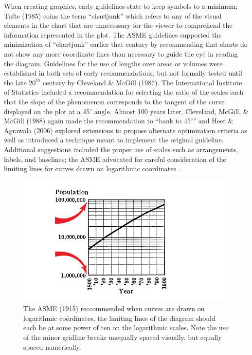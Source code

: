 \documentclass[print]{nuthesis}
\begin{document}
When creating graphics, early guidelines state to keep symbols to a minimum; Tufte (1985) coins the term ``chartjunk'' which refers to any of the visual elements in the chart that are unnecessary for the viewer to comprehend the information represented in the plot.
The ASME guidelines supported the minimization of ``chartjunk'' earlier that century by recommending that charts do not show any more coordinate lines than necessary to guide the eye in reading the diagram.
Guidelines for the use of lengths over areas or volumes were established in both sets of early recommendations, but not formally tested until the late \(20^{th}\) century by Cleveland \& McGill (1987).
The International Institute of Statistics included a recommendation for selecting the ratio of the scales such that the slope of the phenomenon corresponds to the tangent of the curve displayed on the plot at a 45\(^{\circ}\) angle.
Almost 100 years later, Cleveland, McGill, \& McGill (1988) again made the recommendation to ``bank to 45\(^{\circ}\)'' and Heer \& Agrawala (2006) explored extensions to propose alternate optimization criteria as well as introduced a technique meant to implement the original guideline.
Additional suggestions included the proper use of scales such as arrangements, labels, and baselines; the ASME advocated for careful consideration of the limiting lines for curves drawn on logarithmic coordinates .

\begin{figure}[tbp]

{\centering \includegraphics[width=1\linewidth,]{images/standards-of-graphics-log-scale} 

}

\caption[Logarithmic scales ASME guidelines]{The ASME (1915) reccommended when curves are drawn on logarithmic coördinates, the limiting lines of the diagram should each be at some power of ten on the logarithmic scales. Note the use of the minor gridline breaks unequally spaced visually, but equally spaced numerically.}\label{fig:standards-of-graphics-log-scale}
\end{figure}
\end{document}
